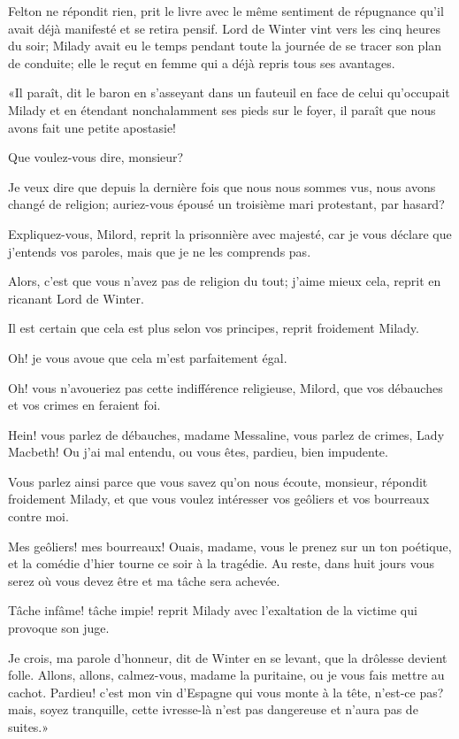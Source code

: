 Felton ne répondit rien, prit le livre avec le même sentiment de répugnance qu'il avait déjà manifesté et se retira pensif. Lord de Winter vint vers les cinq heures du soir; Milady avait eu le temps pendant toute la journée de se tracer son plan de conduite; elle le reçut en femme qui a déjà repris tous ses avantages. 

«Il paraît, dit le baron en s'asseyant dans un fauteuil en face de celui qu'occupait Milady et en étendant nonchalamment ses pieds sur le foyer, il paraît que nous avons fait une petite apostasie! 

\speak  Que voulez-vous dire, monsieur? 

\speak  Je veux dire que depuis la dernière fois que nous nous sommes vus, nous avons changé de religion; auriez-vous épousé un troisième mari protestant, par hasard? 

\speak  Expliquez-vous, Milord, reprit la prisonnière avec majesté, car je vous déclare que j'entends vos paroles, mais que je ne les comprends pas. 

\speak  Alors, c'est que vous n'avez pas de religion du tout; j'aime mieux cela, reprit en ricanant Lord de Winter. 

\speak  Il est certain que cela est plus selon vos principes, reprit froidement Milady. 

\speak  Oh! je vous avoue que cela m'est parfaitement égal. 

\speak  Oh! vous n'avoueriez pas cette indifférence religieuse, Milord, que vos débauches et vos crimes en feraient foi. 

\speak  Hein! vous parlez de débauches, madame Messaline, vous parlez de crimes, Lady Macbeth! Ou j'ai mal entendu, ou vous êtes, pardieu, bien impudente. 

\speak  Vous parlez ainsi parce que vous savez qu'on nous écoute, monsieur, répondit froidement Milady, et que vous voulez intéresser vos geôliers et vos bourreaux contre moi. 

\speak  Mes geôliers! mes bourreaux! Ouais, madame, vous le prenez sur un ton poétique, et la comédie d'hier tourne ce soir à la tragédie. Au reste, dans huit jours vous serez où vous devez être et ma tâche sera achevée. 

\speak  Tâche infâme! tâche impie! reprit Milady avec l'exaltation de la victime qui provoque son juge. 

\speak  Je crois, ma parole d'honneur, dit de Winter en se levant, que la drôlesse devient folle. Allons, allons, calmez-vous, madame la puritaine, ou je vous fais mettre au cachot. Pardieu! c'est mon vin d'Espagne qui vous monte à la tête, n'est-ce pas? mais, soyez tranquille, cette ivresse-là n'est pas dangereuse et n'aura pas de suites.» 

